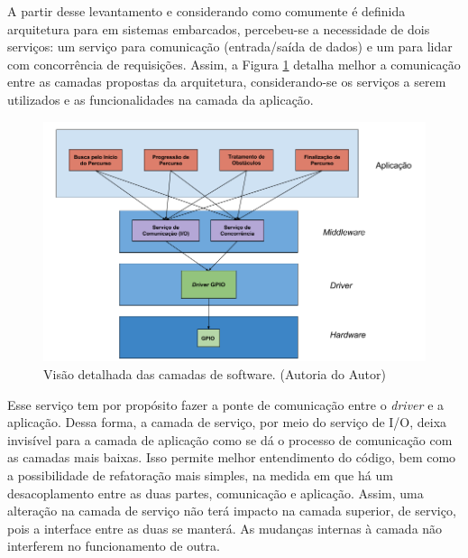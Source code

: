A partir desse levantamento e considerando como comumente é definida arquitetura para \software em sistemas embarcados, percebeu-se a necessidade de dois serviços: um serviço para comunicação (entrada/saída de dados) e um para lidar com concorrência de requisições. Assim, a Figura \ref{fig:layer-soft} detalha melhor a comunicação entre as camadas propostas da arquitetura, considerando-se os serviços a serem utilizados e as funcionalidades na camada da aplicação.

\par
\begin{figure}[h]
  \centering
  \includegraphics[width=\textwidth]{figures/layers-soft.png}
  \caption{Visão detalhada das camadas de software. (\textsf{Autoria do Autor})}
  \label{fig:layer-soft}
\end{figure}
\FloatBarrier
\par

Esse serviço tem por propósito fazer a ponte de comunicação entre o \textit{driver} e a aplicação. Dessa forma, a camada de serviço, por meio do serviço de I/O, deixa invisível para a camada de aplicação como se dá o processo de comunicação com as camadas mais baixas. Isso permite melhor entendimento do código, bem como a possibilidade de refatoração mais simples, na medida em que há um desacoplamento entre as duas partes, comunicação e aplicação. Assim, uma alteração na camada de serviço não terá impacto na camada superior, de serviço, pois a interface entre as duas se manterá. As mudanças internas à camada não interferem no funcionamento de outra.

